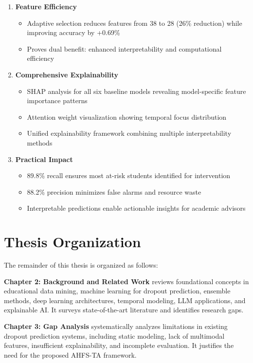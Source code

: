 \begin{enumerate}
    \item \textbf{Feature Efficiency}
    \begin{itemize}
        \item Adaptive selection reduces features from 38 to 28 (26\% reduction) while improving accuracy by +0.69\%
        \item Proves dual benefit: enhanced interpretability and computational efficiency
    \end{itemize}
    
    \item \textbf{Comprehensive Explainability}
    \begin{itemize}
        \item SHAP analysis for all six baseline models revealing model-specific feature importance patterns
        \item Attention weight visualization showing temporal focus distribution
        \item Unified explainability framework combining multiple interpretability methods
    \end{itemize}
    
    \item \textbf{Practical Impact}
    \begin{itemize}
        \item 89.8\% recall ensures most at-risk students identified for intervention
        \item 88.2\% precision minimizes false alarms and resource waste
        \item Interpretable predictions enable actionable insights for academic advisors
    \end{itemize}
\end{enumerate}

\section{Thesis Organization}

The remainder of this thesis is organized as follows:

\textbf{Chapter 2: Background and Related Work} reviews foundational concepts in educational data mining, machine learning for dropout prediction, ensemble methods, deep learning architectures, temporal modeling, LLM applications, and explainable AI. It surveys state-of-the-art literature and identifies research gaps.

\textbf{Chapter 3: Gap Analysis} systematically analyzes limitations in existing dropout prediction systems, including static modeling, lack of multimodal features, insufficient explainability, and incomplete evaluation. It justifies the need for the proposed AHFS-TA framework.


